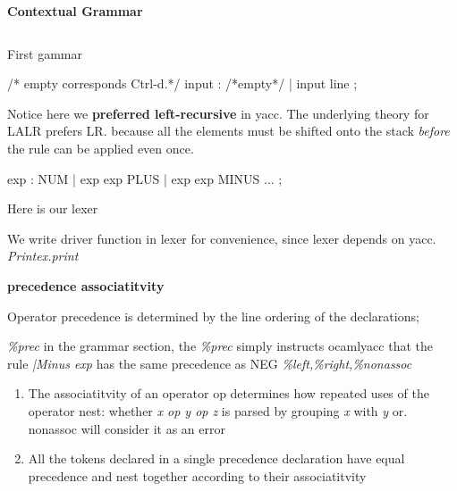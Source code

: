 \textbf{Contextual Grammar}

\inputminted[fontsize=\scriptsize, ]{ocaml}{code/context.ml}


First gammar
\begin{ocamlcode}
  /* empty corresponds Ctrl-d.*/
  input : /*empty*/ {} | input line {}; 
\end{ocamlcode}

Notice here we \textbf{preferred left-recursive} in yacc.
The underlying theory for LALR prefers LR. because all the elements
must be shifted onto the stack \textit{before} the rule can be applied even once.

\begin{ocamlcode}
  exp : NUM | exp exp PLUS | exp exp MINUS  ... ; 
\end{ocamlcode}

Here is our lexer

We write driver function in lexer for convenience, since lexer depends
on yacc. \textit{Printex.print}

\textbf{precedence associatitvity }

Operator precedence is determined by the line ordering of the
declarations; 

\textit{\%prec} in the grammar section, the \textit{\%prec} simply
instructs ocamlyacc that the rule \textit{|Minus exp } has the same
precedence as NEG
\textit{\%left,\%right,\%nonassoc}

\begin{enumerate}
  \item The associatitvity of an operator op determines how repeated
    uses of the operator nest: whether \textit{x op y op z} is parsed
    by grouping \textit{x} with \textit{y} or. nonassoc will consider
    it as an error
  \item All the tokens declared in a single precedence declaration
    have equal precedence and nest together according to their
    associatitvity
  \end{enumerate}

